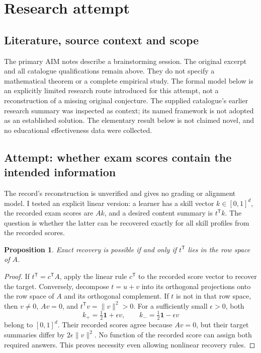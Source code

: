\documentclass[11pt]{article}
\newtheorem{proposition}{Proposition}
\begin{document}
\section{Research attempt}
\subsection{Literature, source context and scope}
The primary AIM notes describe a brainstorming session. The original excerpt and all catalogue qualifications remain above. They do not specify a mathematical theorem or a complete empirical study. The formal model below is an explicitly limited research route introduced for this attempt, not a reconstruction of a missing original conjecture. The supplied catalogue's earlier research summary was inspected as context; its named framework is not adopted as an established solution. The elementary result below is not claimed novel, and no educational effectiveness data were collected.

\subsection{Attempt: whether exam scores contain the intended information}
The record's reconstruction is unverified and gives no grading or alignment model. I tested an explicit linear version: a learner has a skill vector $k\in[0,1]^d$, the recorded exam scores are $Ak$, and a desired content summary is $t^{\mathsf T}k$. The question is whether the latter can be recovered exactly for all skill profiles from the recorded scores.
\begin{proposition}
Exact recovery is possible if and only if $t^{\mathsf T}$ lies in the row space of $A$.
\end{proposition}
\begin{proof}
If $t^{\mathsf T}=c^{\mathsf T}A$, apply the linear rule $c^{\mathsf T}$ to the recorded score vector to recover the target. Conversely, decompose $t=u+v$ into its orthogonal projections onto the row space of $A$ and its orthogonal complement. If $t$ is not in that row space, then $v\ne0$, $Av=0$, and $t^{\mathsf T}v=\|v\|^2>0$. For a sufficiently small $\epsilon>0$, both
\[
k_+=\tfrac12\mathbf1+\epsilon v,\qquad k_-=\tfrac12\mathbf1-\epsilon v
\]
belong to $[0,1]^d$. Their recorded scores agree because $Av=0$, but their target summaries differ by $2\epsilon\|v\|^2$. No function of the recorded score can assign both required answers. This proves necessity even allowing nonlinear recovery rules.
\end{proof}
\end{document}

